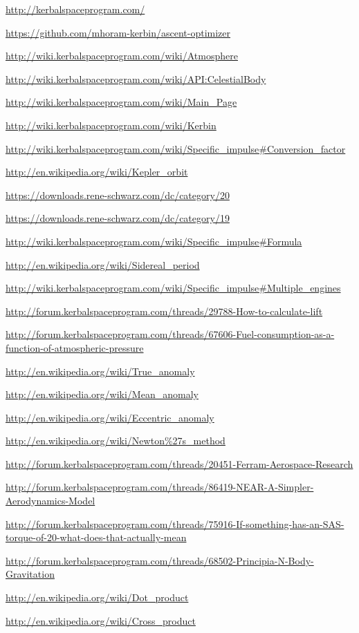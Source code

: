 \documentclass[11pt]{article}
\begin{document}
\begin{thebibliography}{Kerbin}

  \url{http://kerbalspaceprogram.com/}

  \url{https://github.com/mhoram-kerbin/ascent-optimizer}

  \url{http://wiki.kerbalspaceprogram.com/wiki/Atmosphere}

  \url{http://wiki.kerbalspaceprogram.com/wiki/API:CelestialBody}

  \url{http://wiki.kerbalspaceprogram.com/wiki/Main_Page}

  \url{http://wiki.kerbalspaceprogram.com/wiki/Kerbin}

  \url{http://wiki.kerbalspaceprogram.com/wiki/Specific_impulse#Conversion_factor}

  \url{http://en.wikipedia.org/wiki/Kepler_orbit}

  \url{https://downloads.rene-schwarz.com/dc/category/20}

  \url{https://downloads.rene-schwarz.com/dc/category/19}

  \url{http://wiki.kerbalspaceprogram.com/wiki/Specific_impulse#Formula}

  \url{http://en.wikipedia.org/wiki/Sidereal_period}

  \url{http://wiki.kerbalspaceprogram.com/wiki/Specific_impulse#Multiple_engines}

  \url{http://forum.kerbalspaceprogram.com/threads/29788-How-to-calculate-lift}

  \url{http://forum.kerbalspaceprogram.com/threads/67606-Fuel-consumption-as-a-function-of-atmospheric-pressure}

  \url{http://en.wikipedia.org/wiki/True_anomaly}

  \url{http://en.wikipedia.org/wiki/Mean_anomaly}

  \url{http://en.wikipedia.org/wiki/Eccentric_anomaly}

  \url{http://en.wikipedia.org/wiki/Newton\%27s_method}

  \url{http://forum.kerbalspaceprogram.com/threads/20451-Ferram-Aerospace-Research}

  \url{http://forum.kerbalspaceprogram.com/threads/86419-NEAR-A-Simpler-Aerodynamics-Model}

  \url{http://forum.kerbalspaceprogram.com/threads/75916-If-something-has-an-SAS-torque-of-20-what-does-that-actually-mean}

  \url{http://forum.kerbalspaceprogram.com/threads/68502-Principia-N-Body-Gravitation}

  \url{http://en.wikipedia.org/wiki/Dot_product}

  \url{http://en.wikipedia.org/wiki/Cross_product}

\end{thebibliography}
\end{document}
